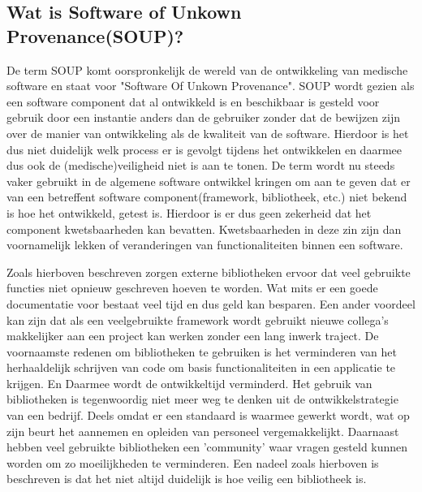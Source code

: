 \subsection{Wat is Software of Unkown Provenance(SOUP)?}\label{subsec:wat-is-soup?2}
De term SOUP komt oorspronkelijk de wereld van de ontwikkeling van medische software en staat voor "Software Of Unkown Provenance".
SOUP wordt gezien als een software component dat al ontwikkeld is en beschikbaar is gesteld voor gebruik door een instantie anders dan de gebruiker zonder dat de bewijzen zijn over de manier van ontwikkeling als de kwaliteit van de software.
Hierdoor is het dus niet duidelijk welk process er is gevolgt tijdens het ontwikkelen en daarmee dus ook de (medische)veiligheid niet is aan te tonen.
De term wordt nu steeds vaker gebruikt in de algemene software ontwikkel kringen om aan te geven dat er van een betreffent software component(framework, bibliotheek, etc.) niet bekend is hoe het ontwikkeld, getest is.
Hierdoor is er dus geen zekerheid dat het component kwetsbaarheden kan bevatten.
Kwetsbaarheden in deze zin zijn dan voornamelijk lekken of veranderingen van functionaliteiten binnen een software.

Zoals hierboven beschreven zorgen externe bibliotheken ervoor dat veel gebruikte functies niet opnieuw geschreven hoeven te worden. Wat mits er een goede documentatie voor bestaat veel tijd en dus geld kan besparen. Een ander voordeel kan zijn dat als een veelgebruikte framework wordt gebruikt nieuwe collega's makkelijker aan een project kan werken zonder een lang inwerk traject.
De voornaamste redenen om bibliotheken te gebruiken is het verminderen van het herhaaldelijk schrijven van code om basis functionaliteiten in een applicatie te krijgen. En Daarmee wordt de ontwikkeltijd verminderd. Het gebruik van bibliotheken is tegenwoordig niet meer weg te denken uit de ontwikkelstrategie van een bedrijf. Deels omdat er een standaard is waarmee gewerkt wordt, wat op zijn beurt het aannemen en opleiden van personeel vergemakkelijkt. Daarnaast hebben veel gebruikte bibliotheken een 'community' waar vragen gesteld kunnen worden om zo moeilijkheden te verminderen. Een nadeel zoals hierboven is beschreven is dat het niet altijd duidelijk is hoe veilig een bibliotheek is.


